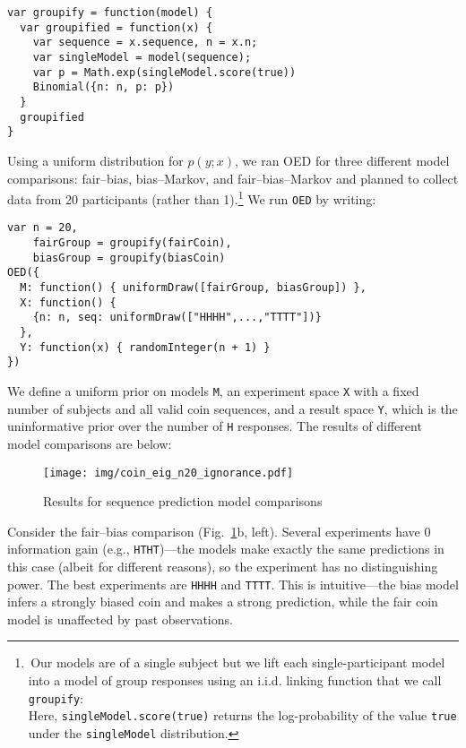 \documentclass[10pt,letterpaper]{article}
\begin{document}
\newsavebox{\LstBox}

\begin{lrbox}{\LstBox}
\begin{lstlisting}
var groupify = function(model) {
  var groupified = function(x) {
    var sequence = x.sequence, n = x.n;
    var singleModel = model(sequence);
    var p = Math.exp(singleModel.score(true))
    Binomial({n: n, p: p})
  }
  groupified
}
\end{lstlisting}
\end{lrbox}

Using a uniform distribution for $p(y; x)$, we ran OED for three different model comparisons: fair--bias, bias--Markov, and fair--bias--Markov and planned to collect data from 20 participants (rather than 1).\footnote{\,Our models are of a single subject but we lift each single-participant model into a model of group responses using an i.i.d. linking function that we call \texttt{groupify}:
\usebox{\LstBox}\\
Here, \texttt{singleModel.score(true)} returns the log-probability of the value \texttt{true} under the \texttt{singleModel} distribution.}
We run \texttt{OED} by writing:
\begin{lstlisting}
var n = 20,
    fairGroup = groupify(fairCoin),
    biasGroup = groupify(biasCoin)
OED({
  M: function() { uniformDraw([fairGroup, biasGroup]) },
  X: function() {
    {n: n, seq: uniformDraw(["HHHH",...,"TTTT"])}
  },
  Y: function(x) { randomInteger(n + 1) }
})
\end{lstlisting}
We define a uniform prior on models \texttt{M}, an experiment space \texttt{X} with a fixed number of subjects and all valid coin sequences, and a result space \texttt{Y}, which is the uninformative prior over the number of \texttt{H} responses.
The results of different model comparisons are below:

\begin{figure}[h]
 \texttt{[image: img/coin\_eig\_n20\_ignorance.pdf]}
  \caption{Results for sequence prediction model comparisons}
  \label{fig:run-coin}
\end{figure}

Consider the fair--bias comparison (Fig.~\ref{fig:run-coin}b, left).
Several experiments have 0 information gain (e.g., \lstinline{HTHT})---the models make exactly the same predictions in this case (albeit for different reasons), so the experiment has no distinguishing power.
The best experiments are \lstinline{HHHH} and \lstinline{TTTT}.
This is intuitive---the bias model infers a strongly biased coin and makes a strong prediction, while the fair coin model is unaffected by past observations.
\end{document}
